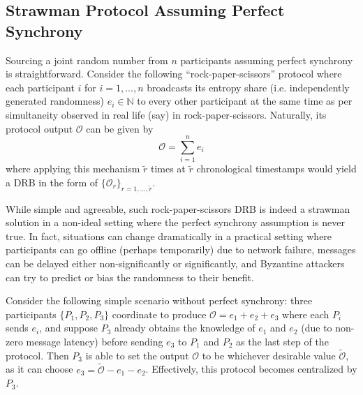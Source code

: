 \documentclass[letterpaper,twocolumn,10pt]{article}
\theoremstyle{definition}
\theoremstyle{remark}
\begin{document}
\subsection{Strawman Protocol Assuming Perfect Synchrony}
Sourcing a joint random number from $n$ participants assuming perfect synchrony is straightforward. Consider the following ``rock-paper-scissors'' protocol where each participant $i$ for $i = 1, ..., n$ broadcasts its entropy share (i.e. independently generated randomness) $e_i \in \mathbb{N}$ to every other participant at the same time as per simultaneity observed in real life (say) in rock-paper-scissors. Naturally, its protocol output $\mathcal{O}$ can be given by
\[
\mathcal{O} = \sum_{i = 1}^n e_i
\]
where applying this mechanism $\tilde{r}$ times at $\tilde{r}$ chronological timestamps would yield a DRB in the form of $\{\mathcal{O}_r\}_{r = 1, ..., \tilde{r}}$.

While simple and agreeable, such rock-paper-scissors DRB is indeed a strawman solution in a non-ideal setting where the perfect synchrony assumption is never true. In fact, situations can change dramatically in a practical setting where participants can go offline (perhaps temporarily) due to network failure, messages can be delayed either non-significantly or significantly, and Byzantine attackers can try to predict or bias the randomness to their benefit.

Consider the following simple scenario without perfect synchrony: three participants $\{P_1, P_2, P_3\}$ coordinate to produce $\mathcal{O} = e_1 + e_2 + e_3$ where each $P_i$ sends $e_i$, and suppose $P_3$ already obtains the knowledge of $e_1$ and $e_2$ (due to non-zero message latency) before sending $e_3$ to $P_1$ and $P_2$ as the last step of the protocol. Then $P_3$ is able to set the output $\mathcal{O}$ to be whichever desirable value $\tilde{\mathcal{O}}$, as it can choose $e_3 = \tilde{\mathcal{O}} - e_1 - e_2$. Effectively, this protocol becomes centralized by $P_3$.
\end{document}
